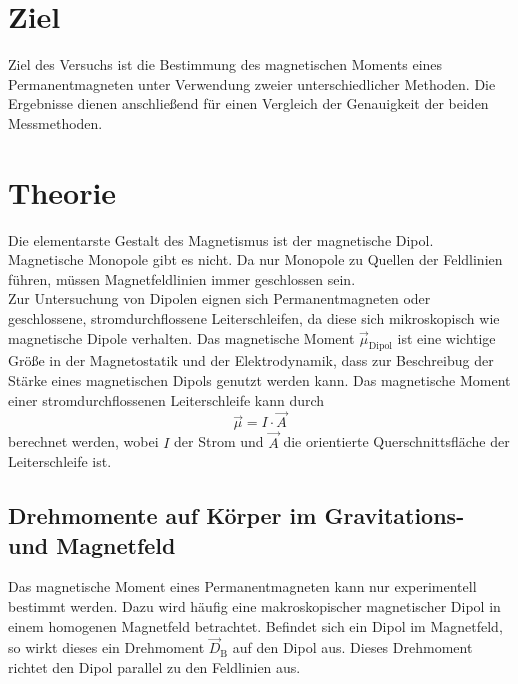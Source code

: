 \section{Ziel}
\label{sec:Ziel}
Ziel des Versuchs ist die Bestimmung des magnetischen Moments eines Permanentmagneten unter Verwendung zweier unterschiedlicher Methoden. Die Ergebnisse dienen anschließend
für einen Vergleich der Genauigkeit der beiden Messmethoden.

\section{Theorie}
\label{sec:Theorie}
Die elementarste Gestalt des Magnetismus ist der magnetische Dipol. Magnetische Monopole gibt es nicht. Da nur Monopole zu Quellen der Feldlinien führen,
müssen Magnetfeldlinien immer geschlossen sein. \\
Zur Untersuchung von Dipolen eignen sich Permanentmagneten oder geschlossene, stromdurchflossene Leiterschleifen, da diese sich mikroskopisch
wie magnetische Dipole verhalten. Das magnetische Moment $\vec{\mu}_{\text{Dipol}}$ ist eine wichtige Größe in der Magnetostatik und der Elektrodynamik, dass zur Beschreibug der
Stärke eines magnetischen Dipols genutzt werden kann. Das magnetische Moment einer stromdurchflossenen Leiterschleife kann durch 
\begin{equation*}
\label{eqn:mu Leiterschleife}
    \vec{\mu} = I \cdot \vec{A}
\end{equation*}
berechnet werden, wobei $I$ der Strom und $\vec{A}$ die orientierte Querschnittsfläche der Leiterschleife ist. \\

\subsection{Drehmomente auf Körper im Gravitations- und Magnetfeld}
\label{subsec:Drehmomente}
Das magnetische Moment eines Permanentmagneten kann nur experimentell bestimmt
werden. Dazu wird häufig eine makroskopischer magnetischer Dipol in einem homogenen Magnetfeld betrachtet. Befindet sich ein Dipol im Magnetfeld, so wirkt dieses ein Drehmoment $\vec{D}_{\text{B}}$
auf den Dipol aus. Dieses Drehmoment richtet den Dipol parallel zu den Feldlinien aus.

